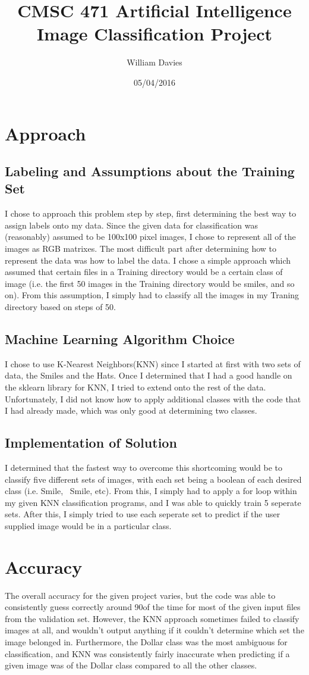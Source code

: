 \documentclass[12pt]{report}
\title{CMSC 471 Artificial Intelligence Image Classification Project}
\author{William Davies}
\date{05/04/2016}
\begin{document}
\maketitle
\section{Approach}
\subsection{Labeling and Assumptions about the Training Set}
I chose to approach this problem step by step, first determining the best way to assign labels onto my data. Since the given data for classification was (reasonably) assumed to be 100x100 pixel images, I chose to represent all of the images as RGB matrixes. The most difficult part after determining how to represent the data was how to label the data. I chose a simple approach which assumed that certain files in a Training directory would be a certain class of image (i.e. the first 50 images in the Training directory would be smiles, and so on). From this assumption, I simply had to classify all the images in my Traning directory based on steps of 50.
\subsection{Machine Learning Algorithm Choice}
I chose to use K-Nearest Neighbors(KNN) since I started at first with two sets of data, the Smiles and the Hats. Once I determined that I had a good handle on the sklearn library for KNN, I tried to extend onto the rest of the data. Unfortunately, I did not know how to apply additional classes with the code that I had already made, which was only good at determining two classes.
\subsection{Implementation of Solution}
I determined that the fastest way to overcome this shortcoming would be to classify five different sets of images, with each set being a boolean of each desired class (i.e. Smile, ~Smile, etc). From this, I simply had to apply a for loop within my given KNN classification programs, and I was able to quickly train 5 seperate sets. After this, I simply tried to use each seperate set to predict if the user supplied image would be in a particular class.
\section{Accuracy}
The overall accuracy for the given project varies, but the code was able to consistently guess correctly around 90\percent of the time for most of the given input files from the validation set. However, the KNN approach sometimes failed to classify images at all, and wouldn't output anything if it couldn't determine which set the image belonged in. Furthermore, the Dollar class was the most ambiguous for classification, and KNN was consistently fairly inaccurate when predicting if a given image was of the Dollar class compared to all the other classes.
\end{document}
